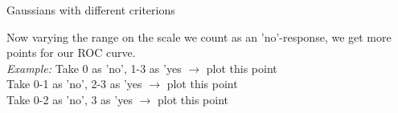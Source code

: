 \documentclass[../main/Notes.tex]{subfiles}
\begin{document}
\caption{Gaussians with different criterions}
\label{fig:2014-06-27-exe6}
Now varying the range on the scale we count as an 'no'-response, we get more points for our ROC curve.\\
\textit{Example:} Take 0 as 'no', 1-3 as 'yes $\rightarrow$ plot this point\\
Take 0-1 as 'no', 2-3 as 'yes $\rightarrow$ plot this point\\
Take 0-2 as 'no', 3 as 'yes $\rightarrow$ plot this point
\end{document}
